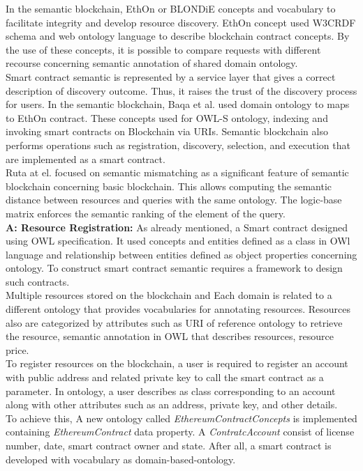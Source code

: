 In the semantic blockchain, EthOn or BLONDiE concepts and vocabulary to facilitate integrity and develop resource discovery. EthOn concept used W3CRDF schema and web ontology language to describe blockchain contract concepts. By the use of these concepts, it is possible to compare requests with different recourse concerning semantic annotation of shared domain ontology. \\
Smart contract semantic is represented by a service layer that gives a correct description of discovery outcome. Thus, it raises the trust of the discovery process for users. In the semantic blockchain, Baqa et al.\cite{Baqa} used domain ontology to maps to EthOn contract. These concepts used for OWL-S ontology, indexing and invoking smart contracts on Blockchain via URIs\cite{Baqa}. 
Semantic blockchain also performs operations such as registration, discovery, selection, and execution that are implemented as a smart contract. \\
Ruta at el.\cite{Ruta} focused on semantic mismatching as a significant feature of semantic blockchain concerning basic blockchain. This allows computing the semantic distance between resources and queries with the same ontology.
The logic-base matrix enforces the semantic ranking of the element of the query\cite{Ruta}. \\ 
\textbf{A: Resource Registration:}
As already mentioned, a Smart contract designed using OWL specification. It used concepts and entities defined as a class in OWl language and relationship between entities defined as object properties concerning ontology. To construct smart contract semantic requires a framework to design such contracts.\\
Multiple resources stored on the blockchain and Each domain is related to a different ontology that provides vocabularies for annotating resources. Resources also are categorized by attributes such as URI of reference ontology to retrieve the resource, semantic annotation in OWL that describes resources, resource price.\\
To register resources on the blockchain, 
a user is required to register an account with public address and related private key to call the smart contract as a parameter. 
In ontology, a user describes as class corresponding to an account along with other attributes such as an address, private key, and other details. \\
To achieve this, A new ontology called \textit{EthereumContractConcepts} is implemented containing \textit{EthereumContract} data property. A \textit{ContratcAccount}
consist of license number, date, smart contract owner and state.
After all, a smart contract is developed with vocabulary as domain-based-ontology\cite{Baqa}.  


